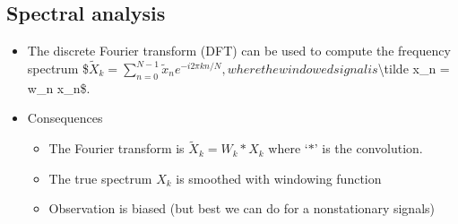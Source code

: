 \documentclass[letterpaper,10pt,english]{jupyterBook}
\begin{document}
\subsection{Spectral analysis}
\label{\detokenize{Representations/Short-time_analysis:spectral-analysis}}\begin{itemize}
\item {} 
\sphinxAtStartPar
The discrete Fourier transform (DFT) can be used to compute the frequency spectrum
\$\(
      \tilde X_k = \sum_{n=0}^{N-1} \tilde x_n e^{-i2\pi kn/N},
\)\(
where the windowed signal is \)\textbackslash{}tilde x\_n = w\_n x\_n\$.

\item {} 
\sphinxAtStartPar
Consequences
\begin{itemize}
\item {} 
\sphinxAtStartPar
The Fourier transform is \(\tilde X_k = W_k*X_k\) where ‘\(*\)’ is the convolution.

\item {} 
\sphinxAtStartPar
The true spectrum \(X_k\) is smoothed with windowing function

\item {} 
\sphinxAtStartPar
Observation is biased (but best we can do for a non\sphinxhyphen{}stationary signals)

\end{itemize}

\end{itemize}
\end{document}
